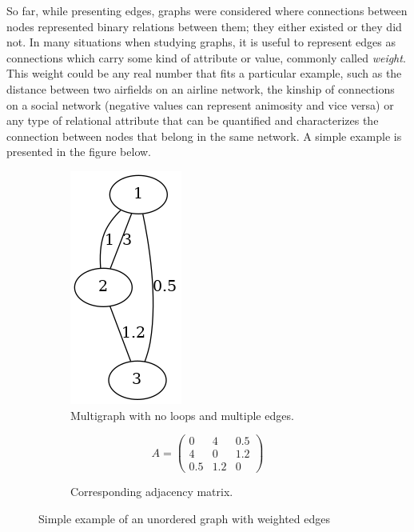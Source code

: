 So far, while presenting edges, graphs were considered where
connections between nodes represented binary relations between them;
they either existed or they did not. In many situations when studying
graphs, it is useful to represent edges as connections which carry some
kind of attribute or value, commonly called \textit{weight}. This weight
could be any real number that fits a particular example, such as the distance
between two airfields on an airline network, the kinship of connections
on a social network (negative values can represent animosity and vice versa)
or any type of relational attribute that can be quantified and
characterizes the connection between nodes that belong in the same
network\cite[p.~109]{book:Newman}. A simple example is presented in
the figure below.
\begin{figure}[h]
     \begin{subfigure}[c]{0.4\textwidth}
         \centering
         \includegraphics[scale=0.5]{Figures/chapter1/simple_weighted.png}
         \caption{Multigraph with no loops and multiple edges.}
     \end{subfigure}
     \hfill
     \begin{subfigure}[c]{0.4\textwidth}
       \centering
       \begin{equation*}
         A = 
        \begin{pmatrix}
        0 & 4 & 0.5 \\
        4 & 0 & 1.2 \\
        0.5 & 1.2 & 0 
        \end{pmatrix}  
\end{equation*}
\newline
\newline
\newline
\newline
\newline
\caption{Corresponding adjacency matrix.}
\label{table:weighted_adj}
\end{subfigure}
  \caption{Simple example of an unordered graph with weighted edges}
  \label{fig:weighted_graph}
\end{figure}

